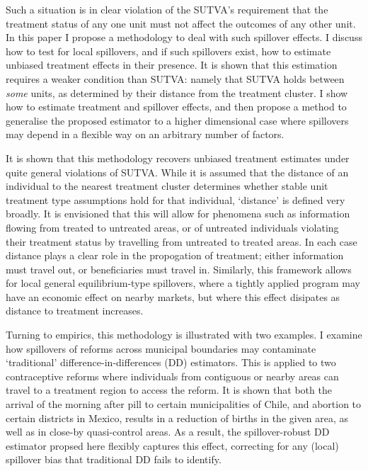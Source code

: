 Such a situation is in clear violation of the SUTVA's requirement that the 
treatment status of any one unit must not affect the outcomes of any other unit.  
In this paper I propose a methodology to deal with such spillover effects.  I
discuss how to test for local spillovers, and if such spillovers exist, how to 
estimate unbiased treatment effects in their presence.  It is shown that this 
estimation requires a weaker condition than SUTVA: namely that SUTVA holds 
between \emph{some} units, as determined by their distance from the treatment 
cluster.  I show how to estimate treatment and spillover effects, and then
propose a method to generalise the proposed estimator to a higher dimensional 
case where spillovers may depend in a flexible way on an arbitrary number of 
factors.

It is shown that this methodology recovers unbiased treatment estimates under 
quite general violations of SUTVA.  While it is assumed that the distance of 
an individual to the nearest treatment cluster determines whether stable unit 
treatment type assumptions hold for that individual, `distance' is defined 
very broadly.  It is envisioned that this will allow for phenomena such as 
information flowing from treated to untreated areas, or of untreated 
individuals violating their treatment status by travelling from untreated to
treated areas.  In each case distance plays a clear role in the propogation 
of treatment; either information must travel out, or beneficiaries must travel 
in. Similarly, this framework allows for local general equilibrium-type 
spillovers, where a tightly applied program may have an economic effect on 
nearby markets, but where this effect disipates as distance to treatment 
increases.

Turning to empirics, this methodology is illustrated with two examples.
I examine how spillovers of reforms across municipal boundaries may 
contaminate `traditional' difference-in-differences (DD) estimators.  This is 
applied to two contraceptive reforms where individuals from contiguous or nearby 
areas can travel to a treatment region to access the reform.  It is shown that 
both the arrival of the morning after pill to certain municipalities of Chile, 
and abortion to certain districts in Mexico, results in a reduction of births in 
the given area, as well as in close-by quasi-control areas.  As a result, the 
spillover-robust DD estimator propsed here flexibly captures this effect, 
correcting for any (local) spillover bias that traditional DD fails to 
identify.

